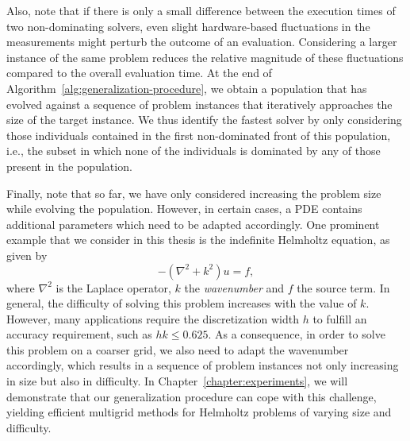 Also, note that if there is only a small difference between the execution times of two non-dominating solvers, even slight hardware-based fluctuations in the measurements might perturb the outcome of an evaluation.
Considering a larger instance of the same problem reduces the relative magnitude of these fluctuations compared to the overall evaluation time.
At the end of Algorithm~\ref{alg:generalization-procedure}, we obtain a population that has evolved against a sequence of problem instances that iteratively approaches the size of the target instance.
We thus identify the fastest solver by only considering those individuals contained in the first non-dominated front of this population, i.e., the subset in which none of the individuals is dominated by any of those present in the population.

Finally, note that so far, we have only considered increasing the problem size while evolving the population.
However, in certain cases, a PDE contains additional parameters which need to be adapted accordingly.
One prominent example that we consider in this thesis is the indefinite Helmholtz equation, as given by
\begin{equation}
	-(\nabla^{2} + k^{2})u = f,
\end{equation}
where $\nabla^{2}$ is the Laplace operator, $k$ the \emph{wavenumber} and $f$ the source term.
In general, the difficulty of solving this problem increases with the value of $k$.
However, many applications require the discretization width $h$ to fulfill an accuracy requirement, such as $h k \leq 0.625$. 
As a consequence, in order to solve this problem on a coarser grid, we also need to adapt the wavenumber accordingly, which results in a sequence of problem instances not only increasing in size but also in difficulty.
In Chapter~\ref{chapter:experiments}, we will demonstrate that our generalization procedure can cope with this challenge, yielding efficient multigrid methods for Helmholtz problems of varying size and difficulty.

